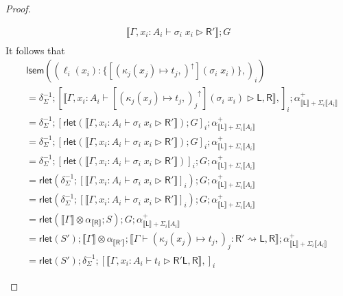 \documentclass[acmsmall,screen,review]{acmart}
\newcommand{\ms}[1]{\ensuremath{\mathsf{#1}}}
\newcommand{\lto}{:}
\newcommand{\wbranch}[3]{#1(#2) \lto \{#3\}}
\newcommand{\upg}[1]{{#1}^\uparrow}
\newcommand{\bhyp}[2]{#1 : #2}
\newcommand{\haslb}[3]{#1 \vdash #2 \rhd #3}
\newcommand{\lbsubst}[4]{#1 \vdash #2: #3 \rightsquigarrow #4}
\newcommand{\dnt}[1]{\llbracket{#1}\rrbracket}
\newcommand{\loopmor}[1]{\ms{lsem}(#1)}
\newcommand{\rlmor}[1]{\ms{rlet}(#1)}
\begin{document}
\begin{proof}
\begin{itemize}[leftmargin=*]
\begin{equation}
\begin{aligned}
{          \dnt{\haslb{\Gamma, \bhyp{x_i}{A_i}}{\sigma_i\;x_i}{\ms{R}'}}
        } ; G \\
      \end{aligned}
    \end{equation}
    It follows that
    \begin{equation}
      \begin{aligned}
        & \loopmor{(\wbranch{\ell_i}{x_i}{[\upg{(\kappa_j(x_j) \mapsto t_j,)}](\sigma_i\;x_i)},)_i}
        \\
        & = \delta^{-1}_\Sigma 
          ; [ \dnt{\haslb{\Gamma, \bhyp{x_i}{A_i}}
                  {[\upg{(\kappa_j(x_j) \mapsto t_j,)_j}](\sigma_i\;x_i)}{\ms{L}, \ms{R}}}, ]_i
          ; \alpha^+_{\dnt{\ms{L}} + \Sigma_i \dnt{A_i}}   \\
        & = \delta^{-1}_\Sigma 
          ; [ \rlmor{
                \dnt{\haslb{\Gamma, \bhyp{x_i}{A_i}}{\sigma_i\;x_i}{\ms{R}'}}
              } ; G ]_i
          ; \alpha^+_{\dnt{\ms{L}} + \Sigma_i \dnt{A_i}}   \\
        & = \delta^{-1}_\Sigma 
          ; [ \rlmor{
                \dnt{\haslb{\Gamma, \bhyp{x_i}{A_i}}{\sigma_i\;x_i}{\ms{R}'}}
              } ; G ]_i
          ; \alpha^+_{\dnt{\ms{L}} + \Sigma_i \dnt{A_i}}   \\
        & = \delta^{-1}_\Sigma 
          ; [\rlmor{
                \dnt{\haslb{\Gamma, \bhyp{x_i}{A_i}}{\sigma_i\;x_i}{\ms{R}'}}
              }]_i ; G ; \alpha^+_{\dnt{\ms{L}} + \Sigma_i \dnt{A_i}}  \\
        & = \rlmor{\delta^{-1}_\Sigma 
          ; [
                \dnt{\haslb{\Gamma, \bhyp{x_i}{A_i}}{\sigma_i\;x_i}{\ms{R}'}}
            ]_i} ; G ; \alpha^+_{\dnt{\ms{L}} + \Sigma_i \dnt{A_i}}   \\
        & = \rlmor{\delta^{-1}_\Sigma 
          ; [
                \dnt{\haslb{\Gamma, \bhyp{x_i}{A_i}}{\sigma_i\;x_i}{\ms{R}'}}
            ]_i} ; G ; \alpha^+_{\dnt{\ms{L}} + \Sigma_i \dnt{A_i}}   \\
        & = \rlmor{\dnt{\Gamma} \otimes \alpha_{\dnt{\ms{R}}} ; S} ; G 
          ; \alpha^+_{\dnt{\ms{L}} + \Sigma_i \dnt{A_i}} \\
        & = \rlmor{S'} ; \dnt{\Gamma} \otimes \alpha_{\dnt{\ms{R'}}} 
          ; \dnt{\lbsubst{\Gamma}{(\kappa_j(x_j) \mapsto t_j,)_j}{\ms{R}'}{\ms{L}, \ms{R}}}
          ; \alpha^+_{\dnt{\ms{L}} + \Sigma_i \dnt{A_i}} \\
        & = \rlmor{S'} ; \delta^{-1}_{\Sigma}
          ; [\dnt{\haslb{\Gamma, \bhyp{x_i}{A_i}}{t_i}{\ms{R}'}{\ms{L}, \ms{R}}},]_i

\end{aligned}
\end{equation}
\end{itemize}
\end{proof}
\end{document}
